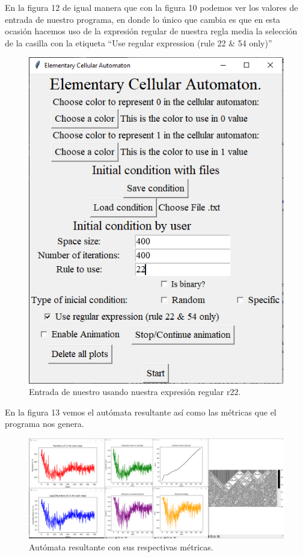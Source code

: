 \documentclass[11pt]{article}
\begin{document}
		En la figura 12 de igual manera que con la figura 10 podemos ver los valores de entrada de nuestro programa, en donde lo único que cambia es que en esta ocasión hacemos uso de la expresión regular de nuestra regla media la selección de la casilla con la etiqueta ``Use regular expression (rule 22 \& 54 only)''
		\begin{figure}[H]
			\centering
			\includegraphics[scale=0.5]{resources/RegEx22/50_prob_regex_entrada.png}
			\caption{Entrada de nuestro usando nuestra expresión regular r22.}\label{fig:picture}
		\end{figure}
		En la figura 13 vemos el autómata resultante así como las métricas que el programa nos genera.
		\begin{figure}[H]
			\includegraphics[scale=0.26]{resources/RegEx22/random_regex_result.png}
			\caption{Autómata resultante con sus respectivas métricas.}\label{fig:picture}
		\end{figure}
\end{document}
